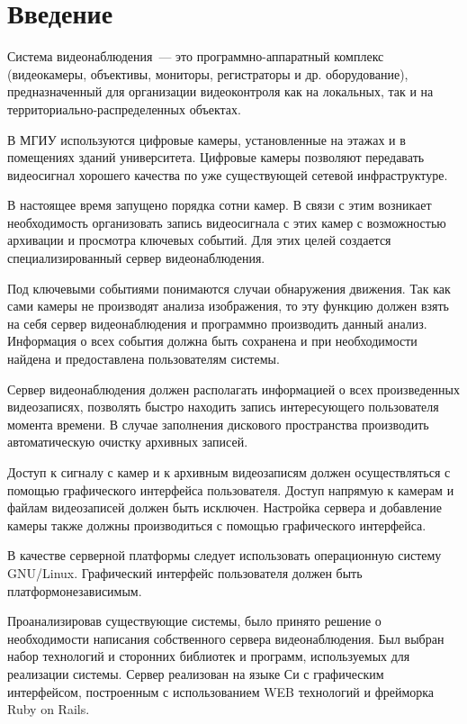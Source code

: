 \chapter*{Введение}

Система видеонаблюдения~--- это программно-аппаратный комплекс
(видеокамеры, объективы, мониторы, регистраторы и др. оборудование),
предназначенный для организации видеоконтроля как на локальных, так и на
территориально-распределенных объектах.

В МГИУ используются цифровые камеры, установленные на этажах и в помещениях зданий университета.
Цифровые камеры позволяют передавать видеосигнал хорошего качества по уже существующей
сетевой инфраструктуре.

В настоящее время запущено порядка сотни камер. В связи с этим возникает необходимость
организовать запись видеосигнала с этих камер с возможностью архивации и просмотра ключевых событий.
Для этих целей создается специализированный сервер видеонаблюдения.

Под ключевыми событиями понимаются случаи обнаружения движения. Так как сами камеры не производят
анализа изображения, то эту функцию должен взять на себя сервер видеонаблюдения и программно
производить данный анализ. Информация о всех события должна быть сохранена и при необходимости
найдена и предоставлена пользователям системы.

Сервер видеонаблюдения должен располагать информацией о всех произведенных видеозаписях,
позволять быстро находить запись интересующего пользователя момента времени. В случае заполнения
дискового пространства производить автоматическую очистку архивных записей.

Доступ к сигналу с камер и к архивным видеозаписям должен осуществляться с помощью графического
интерфейса пользователя. Доступ напрямую к камерам и файлам видеозаписей должен быть исключен.
Настройка сервера и добавление камеры также должны производиться с помощью графического интерфейса.

В качестве серверной платформы следует использовать операционную систему GNU/Linux.
Графический интерфейс пользователя должен быть платформонезависимым.

Проанализировав существующие системы, было принято решение о необходимости написания
собственного сервера видеонаблюдения. Был выбран набор технологий и сторонних библиотек и программ,
используемых для реализации системы. Сервер реализован на языке Си с графическим интерфейсом,
построенным с использованием WEB технологий и фрейморка Ruby on Rails.
